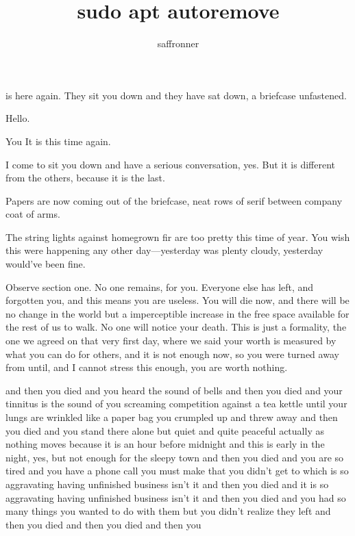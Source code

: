 \documentclass{screenplay}[2012/06/30]
\title{sudo apt autoremove}
\author{saffronner}
\begin{document}
\coverpage


 is here again. They sit you down and they have sat down, a briefcase unfastened.

\begin{dialogue}{}
    Hello.
\end{dialogue}

\begin{dialogue}{You}
    It is this time again.
\end{dialogue}

\begin{dialogue}{}
    I come to sit you down and have a serious conversation, yes. But it is different from the others, because it is the last.
\end{dialogue}

Papers are now coming out of the briefcase, neat rows of serif between company coat of arms. 

The string lights against homegrown fir are too pretty this time of year. You wish this were happening any other day---yesterday was plenty cloudy, yesterday would've been fine.

\begin{dialogue}{}
    Observe section one. No one remains, for you. Everyone else has left, and forgotten you, and this means you are useless. You will die now, and there will be no change in the world but a imperceptible increase in the free space available for the rest of us to walk. No one will notice your death. This is just a formality, the one we agreed on that very first day, where we said your worth is measured by what you can do for others, and it is not enough now, so you were turned away from until, and I cannot stress this enough, you are worth nothing.
\end{dialogue}

and then you died
and you heard the sound of bells
and then you died
and your tinnitus is the sound of you screaming competition against a tea kettle until your lungs are wrinkled like a paper bag you crumpled up and threw away
and then you died
and you stand there alone but quiet and quite peaceful actually as nothing moves because it is an hour before midnight and this is early in the night, yes, but not enough for the sleepy town
and then you died
and you are so tired and you have a phone call you must make that you didn't get to which is so aggravating having unfinished business isn't it
and then you died
and it is so aggravating having unfinished business isn't it
and then you died
and you had so many things you wanted to do with them but you didn't realize they left
and then you died
and then you died
and then you 
\end{document}

